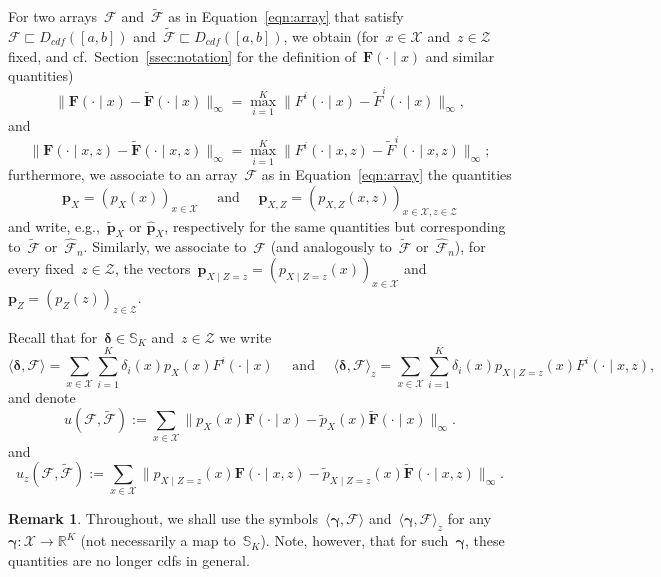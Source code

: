 \documentclass[11pt, a4paper]{article}
\newcommand{\R}{\mathbb{R}}
\theoremstyle{definition}
\newtheorem{remark}{Remark}[section]
\begin{document}
For two arrays~$\mathcal{F}$ and~$\tilde{\mathcal{F}}$ as in Equation~\eqref{eqn:array} that satisfy~$\mathcal{F} \sqsubset D_{cdf}([a,b])$ and~$\tilde{\mathcal{F}}  \sqsubset D_{cdf}([a,b])$, we obtain (for~$x \in \mathcal{X}$ and~$z \in \mathcal{Z}$ fixed, and cf.~Section~\ref{ssec:notation} for the definition of~$\bm{F}(\cdot \mid  x)$ and similar quantities)
\begin{equation*}
\| \bm{F}(\cdot \mid  x) - \tilde{\bm{F}}(\cdot \mid  x)\|_{\infty} = \max_{i = 1}^K \| F^i(\cdot \mid  x) - \tilde{F}^i(\cdot \mid  x)\|_{\infty},
\end{equation*}
and 
\begin{equation*}
\|\bm{F}(\cdot \mid  x, z) - \tilde{\bm{F}}(\cdot \mid  x, z)\|_{\infty} = \max_{i = 1}^K \|F^i(\cdot \mid  x, z) - \tilde{F}^i(\cdot \mid  x, z)\|_{\infty};
\end{equation*}
furthermore, we associate to an array~$\mathcal{F}$ as in Equation~\eqref{eqn:array} the quantities
%
\begin{equation*}
\bm{p}_X = \left(p_X(x)\right)_{x\in \mathcal{X}} \quad \text{ and } \quad \bm{p}_{X, Z} = \left(p_{X, Z}(x, z)\right)_{x\in \mathcal{X}, z \in \mathcal{Z}}
\end{equation*}
%
and write, e.g.,~$\tilde{\bm{p}}_X$ or $\hat{\bm{p}}_X$, respectively for the same quantities but corresponding to~$\tilde{\mathcal{F}}$ or~$\hat{\mathcal{F}}_n$.  Similarly, we associate to~$\mathcal{F}$ (and analogously to~$\tilde{\mathcal{F}}$ or~$\hat{\mathcal{F}}_n$), for every fixed~$z \in \mathcal{Z}$, the vectors~$\bm{p}_{X\mid Z=z} = (p_{X\mid Z=z}(x))_{x \in \mathcal{X}}$ and $\bm{p}_Z = \left(p_Z(z)\right)_{z\in \mathcal{Z}}$.

Recall that for~$\bm{\delta} \in \mathbb{S}_K$ and~$z \in \mathcal{Z}$ we write
\begin{equation*}
\langle \bm{\delta}, \mathcal{F} \rangle = \sum_{x \in \mathcal{X}}  \sum_{i = 1}^K  \delta_i(x) p_X(x) F^i(\cdot\mid x) \quad \text{ and } \quad \langle \bm{\delta}, \mathcal{F} \rangle_z = \sum_{x \in \mathcal{X}} \sum_{i = 1}^K \delta_i(x) p_{X \mid  Z = z}(x) F^i(\cdot\mid x, z),
\end{equation*}
%
and denote 
\begin{equation*}
u({\mathcal{F}}, \tilde{\mathcal{F}}) := \sum_{x \in \mathcal{X}} \|p_X(x) \bm{F}(\cdot \mid  x) - \tilde{p}_X(x)\tilde{\bm{F}}(\cdot \mid  x)\|_{\infty}.
\end{equation*} 
%
and
% 
\begin{equation}\label{eqn:uzdef}
u_z(\mathcal{F}, \tilde{\mathcal{F}}) := \sum_{x \in \mathcal{X}} \|p_{X\mid Z=z}(x) \bm{F}(\cdot \mid  x, z) - \tilde{p}_{X\mid Z=z}(x) \tilde{\bm{F}}(\cdot \mid  x, z)\|_{\infty}.
\end{equation}
\begin{remark}
Throughout, we shall use the symbols~$\langle \bm \gamma, \mathcal{F} \rangle$ and~$\langle  \bm \gamma, \mathcal{F} \rangle_z$ for any~$ \bm \gamma: \mathcal{X} \to \R^K$ (not necessarily a map to~$\mathbb{S}_K$). Note, however, that for such~$ \bm \gamma$, these quantities are no longer cdfs in general.
\end{remark}
\end{document}
